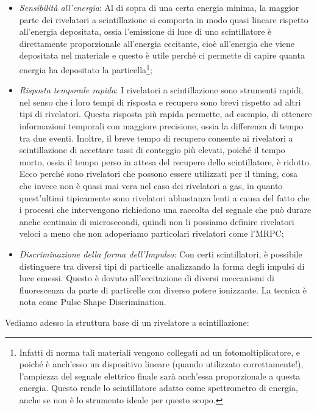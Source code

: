 \begin{itemize}[leftmargin=0.5cm]
   \item \textit{Sensibilità all'energia}: Al di sopra di una certa energia minima, la maggior parte dei rivelatori a scintillazione si comporta in modo quasi lineare rispetto all'energia depositata, ossia l'emissione di luce di uno scintillatore è direttamente proporzionale all'energia eccitante, cioè all'energia che viene depositata nel materiale e questo è utile perché ci permette di capire quanta energia ha depositato la particella\footnote{Infatti di norma tali materiali vengono collegati ad un fotomoltiplicatore, e poiché è anch'esso un dispositivo lineare (quando utilizzato correttamente!), l'ampiezza del segnale elettrico finale sarà anch'essa proporzionale a questa energia. Questo rende lo scintillatore adatto come spettrometro di energia, anche se non è lo strumento ideale per questo scopo.};
   \item \textit{Risposta temporale rapida}: I rivelatori a scintillazione sono strumenti rapidi, nel senso che i loro tempi di risposta e recupero sono brevi rispetto ad altri tipi di rivelatori. Questa risposta più rapida permette, ad esempio, di ottenere informazioni temporali con maggiore precisione, ossia la differenza di tempo tra due eventi. Inoltre, il breve tempo di recupero consente ai rivelatori a scintillazione di accettare tassi di conteggio più elevati, poiché il tempo morto, ossia il tempo perso in attesa del recupero dello scintillatore, è ridotto. Ecco perché sono rivelatori che possono essere utilizzati per il timing, cosa che invece non è quasi mai vera nel caso dei rivelatori a gas, in quanto quest'ultimi tipicamente sono rivelatori abbastanza lenti a causa del fatto che i processi che intervengono richiedono una raccolta del segnale che può durare anche centinaia di microsecondi, quindi non li possiamo definire rivelatori veloci a meno che non adoperiamo particolari rivelatori come l'MRPC;
   \item \textit{Discriminazione della forma dell'Impulso}: Con certi scintillatori, è possibile distinguere tra diversi tipi di particelle analizzando la forma degli impulsi di luce emessi. Questo è dovuto all'eccitazione di diversi meccanismi di fluorescenza da parte di particelle con diverso potere ionizzante. La tecnica è nota come Pulse Shape Discrimination.
\end{itemize}

Vediamo adesso la struttura base di un rivelatore a scintillazione:


